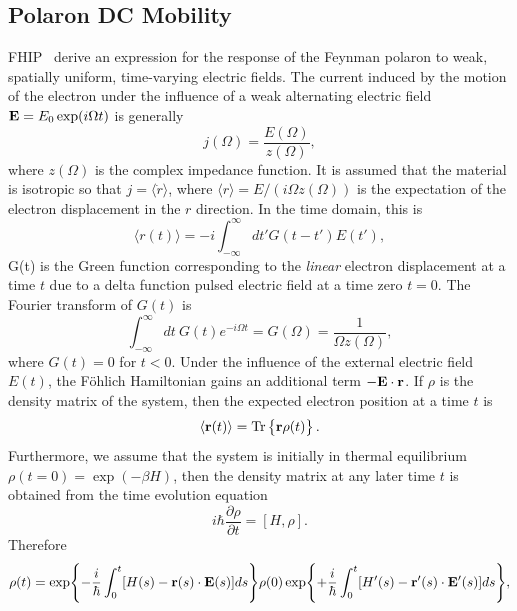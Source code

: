 \subsection{Polaron DC Mobility}
\label{subsec:2-3-1}

FHIP~\cite{feynman_mobility_1962} derive an expression for the response of the Feynman polaron to weak, spatially uniform, time-varying electric fields. The current induced by the motion of the electron under the influence of a weak  alternating electric field $\vb{E} = E_0 \exp(i \Omega t)$ is generally
\begin{equation}
    j(\Omega) = \frac{E(\Omega)}{z(\Omega)} ,
\end{equation}
where $z(\Omega)$ is the complex impedance function. It is assumed that the material is isotropic so that $j = \langle \dot{r} \rangle$, where $\langle r \rangle = E / (i\Omega z(\Omega))$ is the expectation of the electron displacement in the $r$ direction. In the time domain, this is
\begin{equation}
    \langle r(t) \rangle = -i \int^\infty_{-\infty} dt' G(t - t') E(t') ,
\end{equation}
G(t) is the Green function corresponding to the \emph{linear} electron displacement at a time $t$ due to a delta function pulsed electric field at a time zero $t = 0$. The Fourier transform of $G(t)$ is
\begin{equation}
    \int^\infty_{-\infty} dt\ G(t) e^{-i\Omega t} = G(\Omega) = \frac{1}{\Omega z(\Omega)},
\end{equation}
where $G(t) = 0$ for $t < 0$. Under the influence of the external electric field $E(t)$, the F\"ohlich Hamiltonian gains an additional term $- \vb{E} \cdot \vb{r}$. If $\rho$ is the density matrix of the system, then the expected electron position at a time $t$ is
\begin{equation}
    \langle \vb{r}(t) \rangle = \Tr \left\{ \vb{r} \rho(t) \right\}.
\end{equation}
Furthermore, we assume that the system is initially in thermal equilibrium $\rho(t = 0) = \exp(-\beta H)$, then the density matrix at any later time $t$ is obtained from the time evolution equation
\begin{equation}
    i\hbar \frac{\partial \rho}{\partial t} = [H, \rho].
\end{equation}
Therefore
\begin{equation}
    \rho(t) = \exp{-\frac{i}{\hbar}\int^{t}_0 [H(s)- \vb{r}(s)\cdot\vb{E}(s)] ds} \rho(0) \exp{+\frac{i}{\hbar}\int^t_0 [H'(s) - \vb{r}'(s)\cdot\vb{E}'(s)] ds},
\end{equation}
